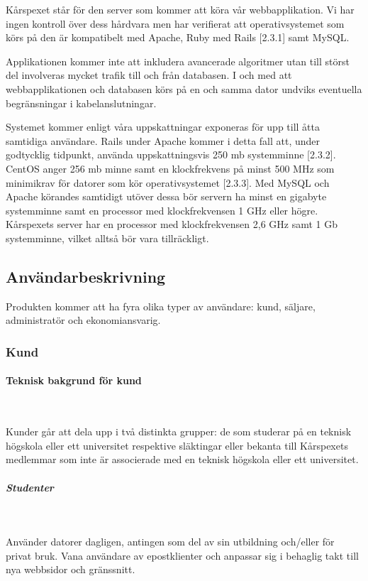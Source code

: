 \documentclass[a4paper, twoside, 11pt, titlepage]{article}
\begin{document}
		Kårspexet står för den server som kommer att köra vår webbapplikation. Vi har ingen kontroll över dess hårdvara men har verifierat att operativsystemet som körs på den är kompatibelt med Apache, Ruby med Rails [2.3.1] samt MySQL. 

		Applikationen kommer inte att inkludera avancerade algoritmer utan till störst del involveras mycket trafik till och från databasen. I och med att webbapplikationen och databasen körs på en och samma dator undviks eventuella begränsningar i kabelanslutningar.

		Systemet kommer enligt våra uppskattningar exponeras för upp till åtta samtidiga användare. Rails under Apache kommer i detta fall att, under godtycklig tidpunkt, använda uppskattningsvis 250 mb systemminne [2.3.2]. CentOS anger 256 mb minne samt en klockfrekvens på minst 500 MHz som minimikrav för datorer som kör operativsystemet [2.3.3]. Med MySQL och Apache körandes samtidigt utöver dessa bör servern ha minst en gigabyte systemminne samt en processor med klockfrekvensen 1 GHz eller högre. Kårspexets server har en processor med klockfrekvensen 2,6 GHz samt 1 Gb systemminne, vilket alltså bör vara tillräckligt.

	\subsection{Användarbeskrivning}


	Produkten kommer att ha fyra olika typer av användare: kund, säljare, administratör och ekonomiansvarig.

		\subsubsection{Kund}



			\paragraph{Teknisk bakgrund för kund}\

			Kunder går att dela upp i två distinkta grupper: de som studerar på en teknisk högskola eller ett universitet respektive släktingar eller bekanta till Kårspexets medlemmar som inte är associerade med en teknisk högskola eller ett universitet.

			\subparagraph{\emph{Studenter}}\

				Använder datorer dagligen, antingen som del av sin utbildning och/eller för privat bruk. Vana användare av epostklienter och anpassar sig i behaglig takt till nya webbsidor och gränssnitt.
\end{document}
